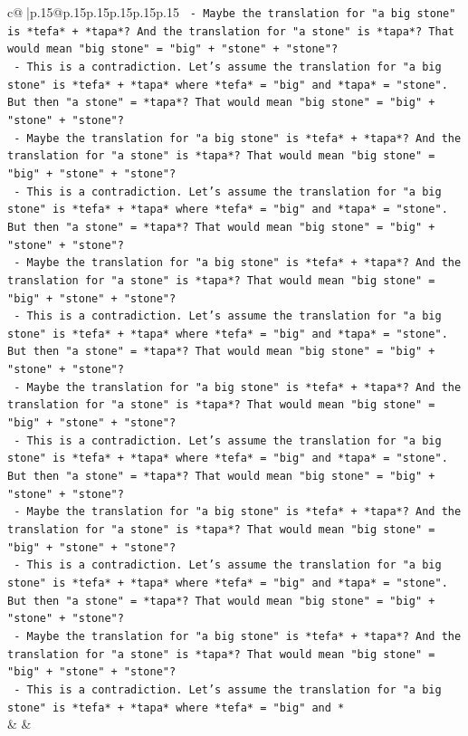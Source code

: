 \documentclass{article}
\begin{document}
{\begin{supertabular}{c@{$\;$}|p{.15\linewidth}@{}p{.15\linewidth}p{.15\linewidth}p{.15\linewidth}p{.15\linewidth}p{.15\linewidth}}
{{{\texttt{        {-} Maybe the translation for "a big stone" is *tefa* + *tapa*? And the translation for "a stone" is *tapa*? That would mean "big stone" = "big" + "stone" + "stone"?} \\
\texttt{        {-} This is a contradiction. Let's assume the translation for "a big stone" is *tefa* + *tapa* where *tefa* = "big" and *tapa* = "stone". But then "a stone" = *tapa*? That would mean "big stone" = "big" + "stone" + "stone"?} \\
\texttt{        {-} Maybe the translation for "a big stone" is *tefa* + *tapa*? And the translation for "a stone" is *tapa*? That would mean "big stone" = "big" + "stone" + "stone"?} \\
\texttt{        {-} This is a contradiction. Let's assume the translation for "a big stone" is *tefa* + *tapa* where *tefa* = "big" and *tapa* = "stone". But then "a stone" = *tapa*? That would mean "big stone" = "big" + "stone" + "stone"?} \\
\texttt{        {-} Maybe the translation for "a big stone" is *tefa* + *tapa*? And the translation for "a stone" is *tapa*? That would mean "big stone" = "big" + "stone" + "stone"?} \\
\texttt{        {-} This is a contradiction. Let's assume the translation for "a big stone" is *tefa* + *tapa* where *tefa* = "big" and *tapa* = "stone". But then "a stone" = *tapa*? That would mean "big stone" = "big" + "stone" + "stone"?} \\
\texttt{        {-} Maybe the translation for "a big stone" is *tefa* + *tapa*? And the translation for "a stone" is *tapa*? That would mean "big stone" = "big" + "stone" + "stone"?} \\
\texttt{        {-} This is a contradiction. Let's assume the translation for "a big stone" is *tefa* + *tapa* where *tefa* = "big" and *tapa* = "stone". But then "a stone" = *tapa*? That would mean "big stone" = "big" + "stone" + "stone"?} \\
\texttt{        {-} Maybe the translation for "a big stone" is *tefa* + *tapa*? And the translation for "a stone" is *tapa*? That would mean "big stone" = "big" + "stone" + "stone"?} \\
\texttt{        {-} This is a contradiction. Let's assume the translation for "a big stone" is *tefa* + *tapa* where *tefa* = "big" and *tapa* = "stone". But then "a stone" = *tapa*? That would mean "big stone" = "big" + "stone" + "stone"?} \\
\texttt{        {-} Maybe the translation for "a big stone" is *tefa* + *tapa*? And the translation for "a stone" is *tapa*? That would mean "big stone" = "big" + "stone" + "stone"?} \\
\texttt{        {-} This is a contradiction. Let's assume the translation for "a big stone" is *tefa* + *tapa* where *tefa* = "big" and *} \\
            }
        }
    }
    & & \\ \\


\end{supertabular}}
\end{document}
